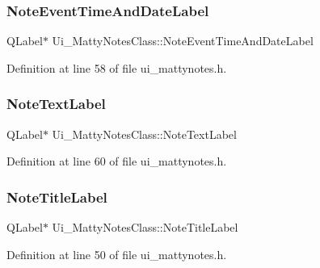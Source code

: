 \hypertarget{classUi__MattyNotesClass_a6d8a5e072fade547f2bdd1ab5b1fa698}{}\label{classUi__MattyNotesClass_a6d8a5e072fade547f2bdd1ab5b1fa698} 
\subsubsection{\texorpdfstring{Note\+Event\+Time\+And\+Date\+Label}{NoteEventTimeAndDateLabel}}
{\footnotesize\ttfamily Q\+Label$\ast$ Ui\+\_\+\+Matty\+Notes\+Class\+::\+Note\+Event\+Time\+And\+Date\+Label}



Definition at line 58 of file ui\+\_\+mattynotes.\+h.

\hypertarget{classUi__MattyNotesClass_abcdc470e53acc292fcc388f84db2ac39}{}\label{classUi__MattyNotesClass_abcdc470e53acc292fcc388f84db2ac39} 
\subsubsection{\texorpdfstring{Note\+Text\+Label}{NoteTextLabel}}
{\footnotesize\ttfamily Q\+Label$\ast$ Ui\+\_\+\+Matty\+Notes\+Class\+::\+Note\+Text\+Label}



Definition at line 60 of file ui\+\_\+mattynotes.\+h.

\hypertarget{classUi__MattyNotesClass_a97f01bf32630dedfa41e7ad7a29d625f}{}\label{classUi__MattyNotesClass_a97f01bf32630dedfa41e7ad7a29d625f} 
\subsubsection{\texorpdfstring{Note\+Title\+Label}{NoteTitleLabel}}
{\footnotesize\ttfamily Q\+Label$\ast$ Ui\+\_\+\+Matty\+Notes\+Class\+::\+Note\+Title\+Label}



Definition at line 50 of file ui\+\_\+mattynotes.\+h.

